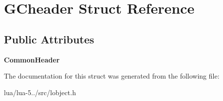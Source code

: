 \hypertarget{struct_g_cheader}{\section{G\+Cheader Struct Reference}
\label{struct_g_cheader}
}
\subsection*{Public Attributes}
\begin{DoxyCompactItemize}
\item 
\hypertarget{struct_g_cheader_ac85ab429b1366b93a337861ed8dcf43f}{{\bfseries Common\+Header}}\label{struct_g_cheader_ac85ab429b1366b93a337861ed8dcf43f}

\end{DoxyCompactItemize}


The documentation for this struct was generated from the following file\+:\begin{DoxyCompactItemize}
\item 
lua/lua-\/5../src/lobject.\+h\end{DoxyCompactItemize}
